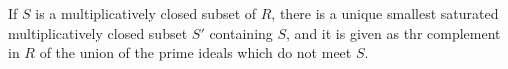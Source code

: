 If $S$ is a multiplicatively closed subset of $R$, there is a unique
smallest saturated multiplicatively closed subset $S'$ containing $S$, and it
is given as thr complement in $R$ of the union of the prime ideals which do
not meet $S$.
